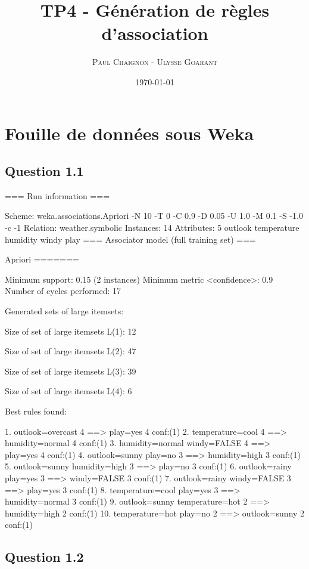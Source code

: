 \documentclass[a4paper,12pt]{article}
\title{TP4 - Génération de règles d'association}
\author{\textsc{Paul Chaignon} - \textsc{Ulysse Goarant}}
\date{\today}
\begin{document}
\lstset{language=Prolog, breaklines=true}

\maketitle

\section{Fouille de données sous Weka}

\subsection*{Question 1.1}

=== Run information ===

Scheme:       weka.associations.Apriori -N 10 -T 0 -C 0.9 -D 0.05 -U 1.0 -M 0.1 -S -1.0 -c -1
Relation:     weather.symbolic
Instances:    14
Attributes:   5
              outlook
              temperature
              humidity
              windy
              play
=== Associator model (full training set) ===


Apriori
=======

Minimum support: 0.15 (2 instances)
Minimum metric <confidence>: 0.9
Number of cycles performed: 17

Generated sets of large itemsets:

Size of set of large itemsets L(1): 12

Size of set of large itemsets L(2): 47

Size of set of large itemsets L(3): 39

Size of set of large itemsets L(4): 6

Best rules found:

 1. outlook=overcast 4 ==> play=yes 4    conf:(1)
 2. temperature=cool 4 ==> humidity=normal 4    conf:(1)
 3. humidity=normal windy=FALSE 4 ==> play=yes 4    conf:(1)
 4. outlook=sunny play=no 3 ==> humidity=high 3    conf:(1)
 5. outlook=sunny humidity=high 3 ==> play=no 3    conf:(1)
 6. outlook=rainy play=yes 3 ==> windy=FALSE 3    conf:(1)
 7. outlook=rainy windy=FALSE 3 ==> play=yes 3    conf:(1)
 8. temperature=cool play=yes 3 ==> humidity=normal 3    conf:(1)
 9. outlook=sunny temperature=hot 2 ==> humidity=high 2    conf:(1)
10. temperature=hot play=no 2 ==> outlook=sunny 2    conf:(1)


\subsection*{Question 1.2}
\end{document}
